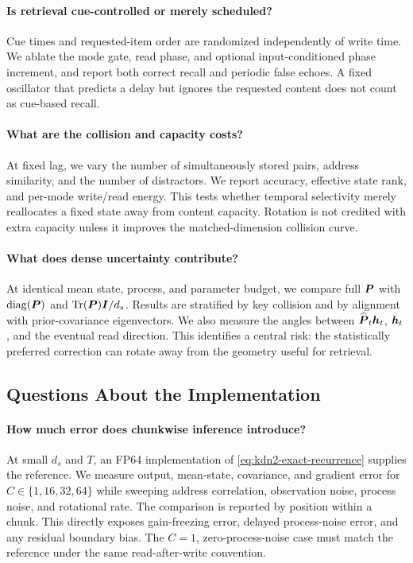 \documentclass[11pt,letterpaper,logo]{yalearxiv}
\begin{document}
\paragraph{Is retrieval cue-controlled or merely scheduled?}
Cue times and requested-item order are randomized independently of write time. We ablate the mode
gate, read phase, and optional input-conditioned phase increment, and report both correct recall
and periodic false echoes. A fixed oscillator that predicts a delay but ignores the requested
content does not count as cue-based recall.

\paragraph{What are the collision and capacity costs?}
At fixed lag, we vary the number of simultaneously stored pairs, address similarity, and the
number of distractors. We report accuracy, effective state rank, and per-mode write/read energy.
This tests whether temporal selectivity merely reallocates a fixed state away from content
capacity. Rotation is not credited with extra capacity unless it improves the matched-dimension
collision curve.

\paragraph{What does dense uncertainty contribute?}
At identical mean state, process, and parameter budget, we compare full $\boldsymbol{P}$ with
$\operatorname{diag}(\boldsymbol{P})$ and $\operatorname{Tr}(\boldsymbol{P})\boldsymbol{I}/d_s$. Results are stratified by key collision and by
alignment with prior-covariance eigenvectors. We also measure the angles between
$\widehat{\boldsymbol{P}}_t\boldsymbol{h}_t$, $\boldsymbol{h}_t$, and the eventual read direction. This identifies a
central risk: the statistically preferred correction can rotate away from the geometry useful for
retrieval.

\subsection{Questions About the Implementation}
\label{sec:kdn2-implementation-evaluation}

\paragraph{How much error does chunkwise inference introduce?}
At small $d_s$ and $T$, an FP64 implementation of
\eqref{eq:kdn2-exact-recurrence} supplies the reference. We measure output, mean-state, covariance,
and gradient error for $C\in\{1,16,32,64\}$ while sweeping address correlation, observation noise,
process noise, and rotational rate. The comparison is reported by position within a chunk. This
directly exposes gain-freezing error, delayed process-noise error, and any residual boundary bias.
The $C=1$, zero-process-noise case must match the reference under the same read-after-write
convention.
\end{document}
